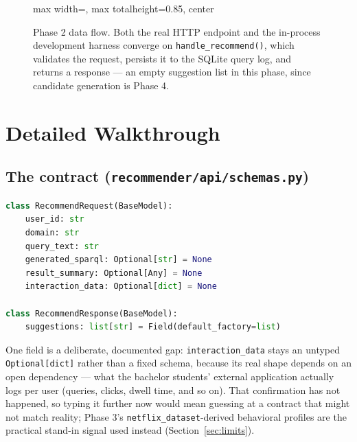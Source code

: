 \documentclass[11pt,a4paper]{article}
\newcommand{\code}[1]{\texttt{#1}}
\begin{document}
\begin{figure}[H]
\begin{adjustbox}{max width=\textwidth, max totalheight=0.85\textheight, center}
\end{adjustbox}
\caption{Phase 2 data flow. Both the real HTTP endpoint and the in-process development harness
converge on \code{handle\_recommend()}, which validates the request, persists it to the SQLite
query log, and returns a response --- an empty suggestion list in this phase, since candidate
generation is Phase 4.}
\label{fig:overview}
\end{figure}

\newpage
\section{Detailed Walkthrough}

\subsection{The contract (\code{recommender/api/schemas.py})}

\begin{lstlisting}[language=Python, caption={The recommender's request/response contract, matching
the roadmap's Phase 2 sketch exactly, with one field left deliberately open.}]
class RecommendRequest(BaseModel):
    user_id: str
    domain: str
    query_text: str
    generated_sparql: Optional[str] = None
    result_summary: Optional[Any] = None
    interaction_data: Optional[dict] = None

class RecommendResponse(BaseModel):
    suggestions: list[str] = Field(default_factory=list)
\end{lstlisting}

One field is a deliberate, documented gap: \code{interaction\_data} stays an untyped
\code{Optional[dict]} rather than a fixed schema, because its real shape depends on an open
dependency --- what the bachelor students' external application actually logs per user (queries,
clicks, dwell time, and so on). That confirmation has not happened, so typing it further now would
mean guessing at a contract that might not match reality; Phase 3's \code{netflix\_dataset}-derived
behavioral profiles are the practical stand-in signal used instead (Section~\ref{sec:limits}).
\end{document}

